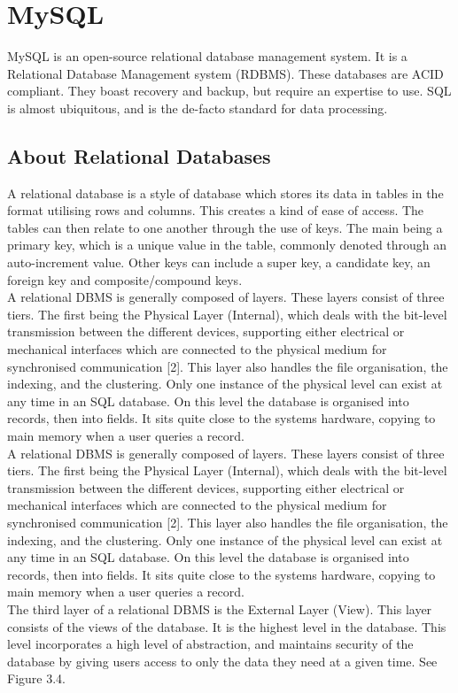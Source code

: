 \section{MySQL}
MySQL is an open-source relational database management system. It is a Relational Database Management system (RDBMS). These databases are ACID compliant. They boast recovery and backup, but require an expertise to use. SQL is almost ubiquitous, and is the de-facto standard for data processing. 

\subsection{About Relational Databases}
A relational database is a style of database which stores its data in tables in the format utilising rows and columns. This creates a kind of ease of access. The tables can then relate to one another through the use of keys. The main being a primary key, which is a unique value in the table, commonly denoted through an auto-increment value. Other keys can include a super key, a candidate key, an foreign key and composite/compound keys. 
\\A relational DBMS is generally composed of layers. These layers consist of three tiers. The first being the Physical Layer (Internal), which deals with the bit-level transmission between the different devices, supporting either electrical or mechanical interfaces which are connected to the physical medium for synchronised communication [2]. This layer also handles the file organisation, the indexing, and the clustering. Only one instance of the physical level can exist at any time in an SQL database. On this level the database is organised into records, then into fields. It sits quite close to the systems hardware, copying to main memory when a user queries a record.
\\A relational DBMS is generally composed of layers. These layers consist of three tiers. The first being the Physical Layer (Internal), which deals with the bit-level transmission between the different devices, supporting either electrical or mechanical interfaces which are connected to the physical medium for synchronised communication [2]. This layer also handles the file organisation, the indexing, and the clustering. Only one instance of the physical level can exist at any time in an SQL database. On this level the database is organised into records, then into fields. It sits quite close to the systems hardware, copying to main memory when a user queries a record.
\\The third layer of a relational DBMS is the External Layer (View). This layer consists of the views of the database. It is the highest level in the database. This level incorporates a high level of abstraction, and maintains security of the database by giving users access to only the data they need at a given time.
See Figure 3.4.

